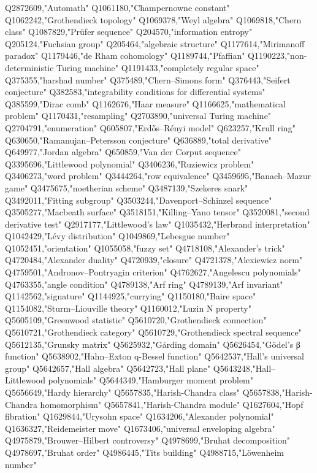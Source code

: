 Q2872609,"Automath"
Q1061180,"Champernowne constant"
Q1062242,"Grothendieck topology"
Q1069378,"Weyl algebra"
Q1069818,"Chern class"
Q1087829,"Prüfer sequence"
Q204570,"information entropy"
Q205124,"Fuchsian group"
Q205464,"algebraic structure"
Q1177614,"Mirimanoff paradox"
Q1179446,"de Rham cohomology"
Q1189744,"Pfaffian"
Q1190223,"non-deterministic Turing machine"
Q1191433,"completely regular space"
Q375355,"harshad number"
Q375489,"Chern–Simons form"
Q376443,"Seifert conjecture"
Q382583,"integrability conditions for differential systems"
Q385599,"Dirac comb"
Q1162676,"Haar measure"
Q1166625,"mathematical problem"
Q1170431,"resampling"
Q2703890,"universal Turing machine"
Q2704791,"enumeration"
Q605807,"Erdős–Rényi model"
Q623257,"Krull ring"
Q630650,"Ramanujan–Petersson conjecture"
Q636889,"total derivative"
Q649977,"Jordan algebra"
Q650859,"Van der Corput sequence"
Q3395696,"Littlewood polynomial"
Q3406236,"Ruziewicz problem"
Q3406273,"word problem"
Q3444264,"row equivalence"
Q3459695,"Banach–Mazur game"
Q3475675,"noetherian scheme"
Q3487139,"Szekeres snark"
Q3492011,"Fitting subgroup"
Q3503244,"Davenport–Schinzel sequence"
Q3505277,"Macbeath surface"
Q3518151,"Killing–Yano tensor"
Q3520081,"second derivative test"
Q2917177,"Littlewood's law"
Q1035432,"Herbrand interpretation"
Q1042429,"Lévy distribution"
Q1049869,"Lebesgue number"
Q1052451,"orientation"
Q1055058,"fuzzy set"
Q4718108,"Alexander's trick"
Q4720484,"Alexander duality"
Q4720939,"closure"
Q4721378,"Alexiewicz norm"
Q4759501,"Andronov–Pontryagin criterion"
Q4762627,"Angelescu polynomials"
Q4763355,"angle condition"
Q4789138,"Arf ring"
Q4789139,"Arf invariant"
Q1142562,"signature"
Q1144925,"currying"
Q1150180,"Baire space"
Q1154082,"Sturm–Liouville theory"
Q1160012,"Luzin N property"
Q5605109,"Greenwood statistic"
Q5610720,"Grothendieck connection"
Q5610721,"Grothendieck category"
Q5610729,"Grothendieck spectral sequence"
Q5612135,"Grunsky matrix"
Q5625932,"Gårding domain"
Q5626454,"Gödel's β function"
Q5638902,"Hahn–Exton q-Bessel function"
Q5642537,"Hall's universal group"
Q5642657,"Hall algebra"
Q5642723,"Hall plane"
Q5643248,"Hall–Littlewood polynomials"
Q5644349,"Hamburger moment problem"
Q5656649,"Hardy hierarchy"
Q5657835,"Harish-Chandra class"
Q5657838,"Harish-Chandra homomorphism"
Q5657841,"Harish-Chandra module"
Q1627604,"Hopf fibration"
Q1629844,"Urysohn space"
Q1634206,"Alexander polynomial"
Q1636327,"Reidemeister move"
Q1673406,"universal enveloping algebra"
Q4975879,"Brouwer–Hilbert controversy"
Q4978699,"Bruhat decomposition"
Q4978697,"Bruhat order"
Q4986445,"Tits building"
Q4988715,"Löwenheim number"
